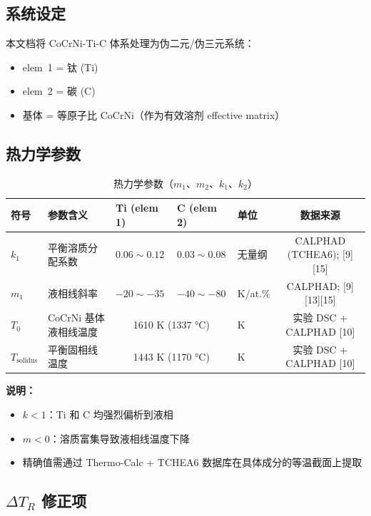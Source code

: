 \documentclass[12pt, a4paper]{article}
\begin{document}
\subsection{系统设定}

本文档将 CoCrNi-Ti-C 体系处理为伪二元/伪三元系统：
\begin{itemize}
  \item elem~1 = 钛 (Ti)
  \item elem~2 = 碳 (C)
  \item 基体 = 等原子比 CoCrNi（作为有效溶剂 effective matrix）
\end{itemize}

\subsection{热力学参数}

\begin{table}[h!]
\centering
\caption{热力学参数（$m_1$、$m_2$、$k_1$、$k_2$）}
\begin{tabular}{lllllc}
\toprule
符号 & 参数含义 & Ti (elem 1) & C (elem 2) & 单位 & 数据来源 \\
\midrule
$k_1$ & 平衡溶质分配系数 & $0.06 \sim 0.12$ & $0.03 \sim 0.08$ & 无量纲 & CALPHAD (TCHEA6); [9][15] \\
$m_1$ & 液相线斜率 & $-20 \sim -35$ & $-40 \sim -80$ & K/at.\% & CALPHAD; [9][13][15] \\
$T_0$ & CoCrNi 基体液相线温度 & \multicolumn{2}{c}{1610 K (1337 °C)} & K & 实验 DSC + CALPHAD [10] \\
$T_\text{solidus}$ & 平衡固相线温度 & \multicolumn{2}{c}{1443 K (1170 °C)} & K & 实验 DSC + CALPHAD [10] \\
\bottomrule
\end{tabular}
\end{table}

\noindent\textbf{说明：}
\begin{itemize}
  \item $k < 1$：Ti 和 C 均强烈偏析到液相
  \item $m < 0$：溶质富集导致液相线温度下降
  \item 精确值需通过 Thermo-Calc + TCHEA6 数据库在具体成分的等温截面上提取
\end{itemize}

\subsection{$\Delta T_R$ 修正项}
\end{document}
